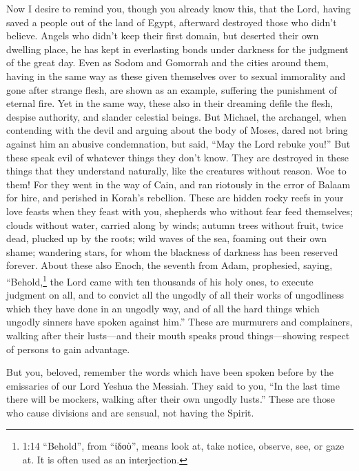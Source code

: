 \myverse{}Now I desire to remind you, though you already know this, that the Lord, having saved a people out of the land of Egypt, afterward destroyed those who didn’t believe. \myverse{}Angels who didn’t keep their first domain, but deserted their own dwelling place, he has kept in everlasting bonds under darkness for the judgment of the great day. \myverse{}Even as Sodom and Gomorrah and the cities around them, having in the same way as these given themselves over to sexual immorality and gone after strange flesh, are shown as an example, suffering the punishment of eternal fire. \myverse{}Yet in the same way, these also in their dreaming defile the flesh, despise authority, and slander celestial beings. \myverse{}But Michael, the archangel, when contending with the devil and arguing about the body of Moses, dared not bring against him an abusive condemnation, but said, “May the Lord rebuke you!” \myverse{}But these speak evil of whatever things they don’t know. They are destroyed in these things that they understand naturally, like the creatures without reason. \myverse{}Woe to them! For they went in the way of Cain, and ran riotously in the error of Balaam for hire, and perished in Korah’s rebellion. \myverse{}These are hidden rocky reefs in your love feasts when they feast with you, shepherds who without fear feed themselves; clouds without water, carried along by winds; autumn trees without fruit, twice dead, plucked up by the roots; \myverse{}wild waves of the sea, foaming out their own shame; wandering stars, for whom the blackness of darkness has been reserved forever. \myverse{}About these also Enoch, the seventh from Adam, prophesied, saying, “Behold,\footnote{1:14 “Behold”, from “ἰδοὺ”, means look at, take notice, observe, see, or gaze at. It is often used as an interjection.} the Lord came with ten thousands of his holy ones, \myverse{}to execute judgment on all, and to convict all the ungodly of all their works of ungodliness which they have done in an ungodly way, and of all the hard things which ungodly sinners have spoken against him.” \myverse{}These are murmurers and complainers, walking after their lusts—and their mouth speaks proud things—showing respect of persons to gain advantage.


\myverse{}But you, beloved, remember the words which have been spoken before by the emissaries of our Lord Yeshua the Messiah. \myverse{}They said to you, “In the last time there will be mockers, walking after their own ungodly lusts.” \myverse{}These are those who cause divisions and are sensual, not having the Spirit.


